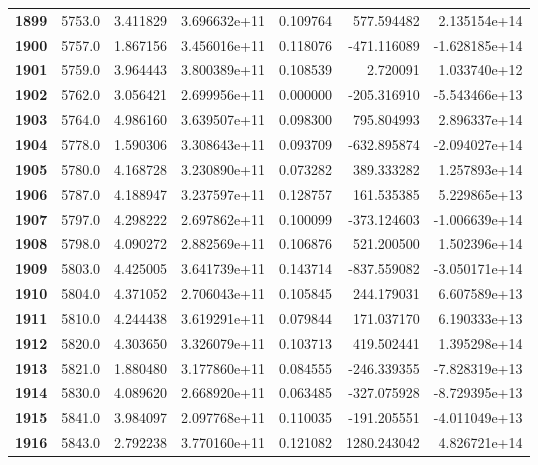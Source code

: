 \documentclass{report}[12pt]
\begin{document}
\begin{center}
\begin{tabular}{lrrrrrr}
\textbf{1899} &         5753.0 &   3.411829 &  3.696632e+11 &    0.109764 &   577.594482 &  2.135154e+14 \\
\textbf{1900} &         5757.0 &   1.867156 &  3.456016e+11 &    0.118076 &  -471.116089 & -1.628185e+14 \\
\textbf{1901} &         5759.0 &   3.964443 &  3.800389e+11 &    0.108539 &     2.720091 &  1.033740e+12 \\
\textbf{1902} &         5762.0 &   3.056421 &  2.699956e+11 &    0.000000 &  -205.316910 & -5.543466e+13 \\
\textbf{1903} &         5764.0 &   4.986160 &  3.639507e+11 &    0.098300 &   795.804993 &  2.896337e+14 \\
\textbf{1904} &         5778.0 &   1.590306 &  3.308643e+11 &    0.093709 &  -632.895874 & -2.094027e+14 \\
\textbf{1905} &         5780.0 &   4.168728 &  3.230890e+11 &    0.073282 &   389.333282 &  1.257893e+14 \\
\textbf{1906} &         5787.0 &   4.188947 &  3.237597e+11 &    0.128757 &   161.535385 &  5.229865e+13 \\
\textbf{1907} &         5797.0 &   4.298222 &  2.697862e+11 &    0.100099 &  -373.124603 & -1.006639e+14 \\
\textbf{1908} &         5798.0 &   4.090272 &  2.882569e+11 &    0.106876 &   521.200500 &  1.502396e+14 \\
\textbf{1909} &         5803.0 &   4.425005 &  3.641739e+11 &    0.143714 &  -837.559082 & -3.050171e+14 \\
\textbf{1910} &         5804.0 &   4.371052 &  2.706043e+11 &    0.105845 &   244.179031 &  6.607589e+13 \\
\textbf{1911} &         5810.0 &   4.244438 &  3.619291e+11 &    0.079844 &   171.037170 &  6.190333e+13 \\
\textbf{1912} &         5820.0 &   4.303650 &  3.326079e+11 &    0.103713 &   419.502441 &  1.395298e+14 \\
\textbf{1913} &         5821.0 &   1.880480 &  3.177860e+11 &    0.084555 &  -246.339355 & -7.828319e+13 \\
\textbf{1914} &         5830.0 &   4.089620 &  2.668920e+11 &    0.063485 &  -327.075928 & -8.729395e+13 \\
\textbf{1915} &         5841.0 &   3.984097 &  2.097768e+11 &    0.110035 &  -191.205551 & -4.011049e+13 \\
\textbf{1916} &         5843.0 &   2.792238 &  3.770160e+11 &    0.121082 &  1280.243042 &  4.826721e+14 \\

\end{tabular}
\end{center}
\end{document}
